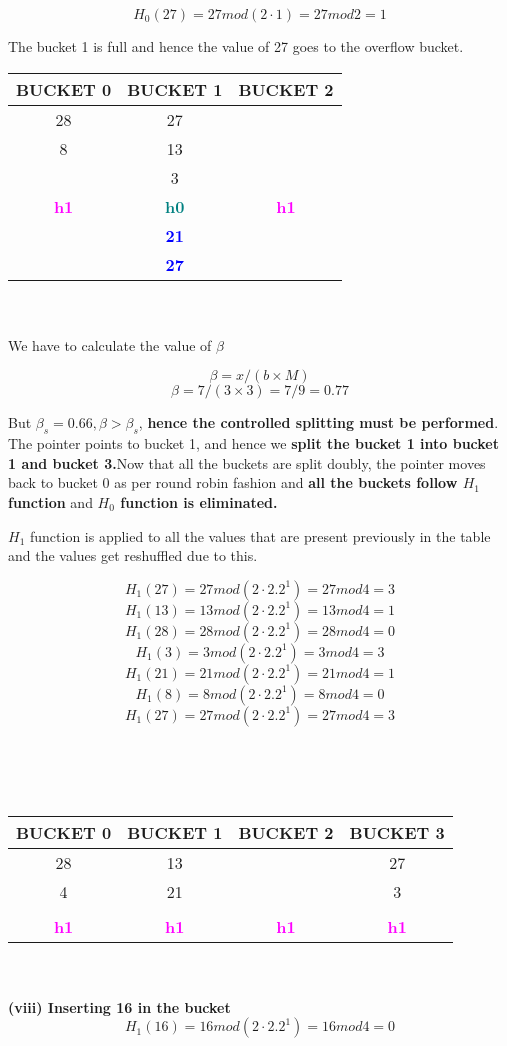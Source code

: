 \[H_0(27) = 27 mod (2 \cdot 1)  = 27 mod 2 = 1\] 

The bucket 1 is full and hence the value of 27 goes to the overflow bucket.

\begin{tabular}{ |c|c|c| } 
 \hline
 BUCKET 0 & \textbf{\color{red}{P}} BUCKET 1 & BUCKET 2\\ [0.5ex] 
 \hline\hline
 \hline
  28 & 27 & \\ 
   8 & 13 & \\
   & 3 & \\
 \hline
 \hline
\textbf{\textcolor{magenta}{h1}} & \textbf{\textcolor{teal}{h0}}& \textbf{\textcolor{magenta}{h1}}\\ [0.5ex] 
 \hline
     & \textbf{\textcolor{blue}{21}}\\ 
     & \textbf{\textcolor{blue}{27}}
\end{tabular}
\\
\\
We have to calculate the value of $\beta$

\[\beta = x/(b \times M)\]
\[\beta = 7/(3 \times 3) = 7/9 = 0.77\]

But $\beta_s = 0.66 , \beta>\beta_s$,\textbf{ hence the controlled splitting must be performed}. The pointer points to bucket 1, and hence we \textbf{split the bucket 1 into bucket 1 and bucket 3.}Now that all the buckets are split doubly, the pointer moves back to bucket 0 as per round robin fashion and \textbf{all the buckets follow $H_1$ function} and \textbf{$H_0$ function is eliminated.}


\newpage

$H_1$ function is applied to all the values that are present previously in the table and the values get reshuffled due to this.

\[H_1(27) = 27 mod (2 \cdot 2.2^1)  = 27 mod 4 = 3\]
\[H_1(13) = 13 mod (2 \cdot 2.2^1)  = 13 mod 4 = 1\]
\[H_1(28) = 28 mod (2 \cdot 2.2^1)  = 28 mod 4 = 0\]
\[H_1(3) = 3 mod (2 \cdot 2.2^1)  = 3 mod 4 = 3\]
\[H_1(21) = 21 mod (2 \cdot 2.2^1)  = 21 mod 4 = 1\]
\[H_1(8) = 8 mod (2 \cdot 2.2^1)  = 8 mod 4 = 0\]
\[H_1(27) = 27 mod (2 \cdot 2.2^1)  = 27 mod 4 = 3\]

\\
\\
\\

\begin{tabular}{ |c|c|c|c| } 
 \hline
 \textbf{\color{red}{P}} BUCKET 0 & BUCKET 1 & BUCKET 2 & BUCKET 3\\ [0.5ex] 
 \hline\hline
 \hline
  28 & 13 &  &27\\ 
   4 & 21 &  &3\\
    &  &  &\\
 \hline
 \hline
\textbf{\textcolor{magenta}{h1}} & \textbf{\textcolor{magenta}{h1}}& \textbf{\textcolor{magenta}{h1}}&\textbf{\textcolor{magenta}{h1}}\\ [0.5ex] 
 \hline
\end{tabular}
\\
\\
\textbf{(viii) Inserting 16 in the bucket}
\[H_1(16) = 16 mod (2 \cdot 2.2^1)  = 16 mod 4 = 0\]


